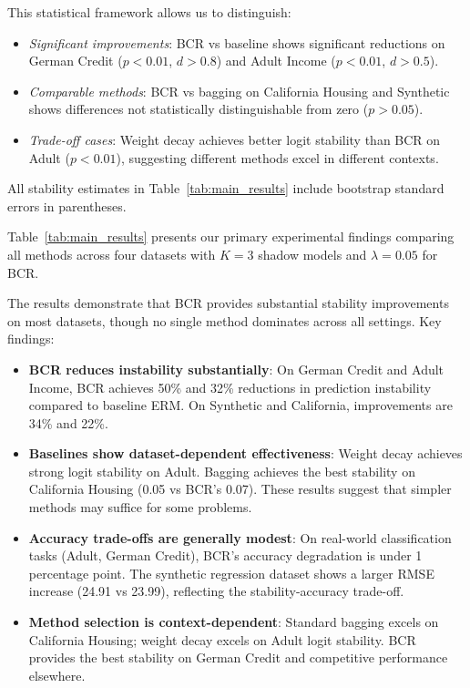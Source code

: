 \documentclass[12pt, letterpaper]{article}
\begin{document}
This statistical framework allows us to distinguish:
\begin{itemize}
\item \emph{Significant improvements}: BCR vs baseline shows significant reductions on German Credit ($p<0.01$, $d>0.8$) and Adult Income ($p<0.01$, $d>0.5$).
\item \emph{Comparable methods}: BCR vs bagging on California Housing and Synthetic shows differences not statistically distinguishable from zero ($p>0.05$).
\item \emph{Trade-off cases}: Weight decay achieves better logit stability than BCR on Adult ($p<0.01$), suggesting different methods excel in different contexts.
\end{itemize}

All stability estimates in Table~\ref{tab:main_results} include bootstrap standard errors in parentheses.

Table~\ref{tab:main_results} presents our primary experimental findings comparing all methods across four datasets with $K=3$ shadow models and $\lambda=0.05$ for BCR.

\begin{table}[t]
\centering
\caption{Comparison of predictive performance and bootstrap stability across all methods. Stability values show point estimate with bootstrap SE in parentheses (computed over $R=30$ runs). Stability RMSE is in prediction units (lower is better).}
\label{tab:main_results}
\small

\end{table}

The results demonstrate that BCR provides substantial stability improvements on most datasets, though no single method dominates across all settings. Key findings:

\begin{itemize}
\item \textbf{BCR reduces instability substantially}: On German Credit and Adult Income, BCR achieves 50\% and 32\% reductions in prediction instability compared to baseline ERM. On Synthetic and California, improvements are 34\% and 22\%.
\item \textbf{Baselines show dataset-dependent effectiveness}: Weight decay achieves strong logit stability on Adult. Bagging achieves the best stability on California Housing (0.05 vs BCR's 0.07). These results suggest that simpler methods may suffice for some problems.
\item \textbf{Accuracy trade-offs are generally modest}: On real-world classification tasks (Adult, German Credit), BCR's accuracy degradation is under 1 percentage point. The synthetic regression dataset shows a larger RMSE increase (24.91 vs 23.99), reflecting the stability-accuracy trade-off.
\item \textbf{Method selection is context-dependent}: Standard bagging excels on California Housing; weight decay excels on Adult logit stability. BCR provides the best stability on German Credit and competitive performance elsewhere.
\end{itemize}
\end{document}
